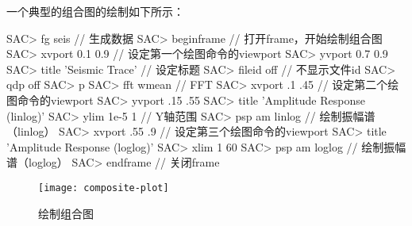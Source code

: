 一个典型的组合图的绘制如下所示：
\begin{SACCode}
SAC> fg seis                        // 生成数据
SAC> beginframe                     // 打开frame，开始绘制组合图
SAC> xvport 0.1 0.9                 // 设定第一个绘图命令的viewport
SAC> yvport 0.7 0.9                 
SAC> title 'Seismic Trace'          // 设定标题
SAC> fileid off                     // 不显示文件id
SAC> qdp off                        
SAC> p                              
SAC> fft wmean                      // FFT
SAC> xvport .1 .45                  // 设定第二个绘图命令的viewport
SAC> yvport .15 .55
SAC> title 'Amplitude Response (linlog)'
SAC> ylim 1e-5 1                    // Y轴范围
SAC> psp am linlog                  // 绘制振幅谱（linlog）
SAC> xvport .55 .9                  // 设定第三个绘图命令的viewport
SAC> title 'Amplitude Response (loglog)'
SAC> xlim 1 60
SAC> psp am loglog                  // 绘制振幅谱（loglog）
SAC> endframe                       // 关闭frame
\end{SACCode}

\begin{figure}[H]
\centering
\texttt{[image: composite-plot]}
\caption{绘制组合图}
\label{fig:composite-plot}
\end{figure}
